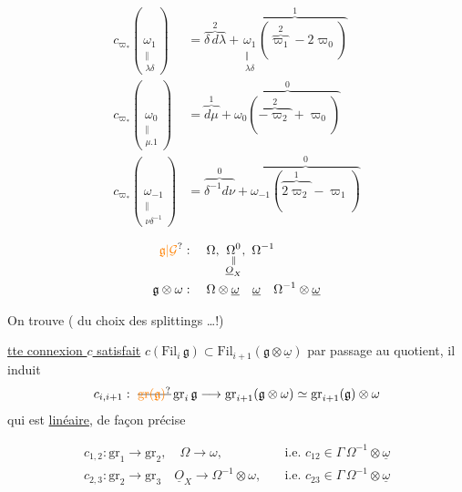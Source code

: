 \[ \begin{aligned}
 c_{\varpi_*}(\underset{\substack{\Vert\\\lambda\delta}}{\omega_1})&=\overbrace{\delta\,d\lambda}^{2}+\overbrace{\underset{\substack{\Vert\\\lambda\delta}}{\omega_1}(\overbrace{\varpi_1}^{2}-2\varpi_0)}^{1}\\
 c_{\varpi_*}(\underset{\substack{\Vert\\\mu.1}}{\omega_0})&=\overbrace{d\mu}^{1}+\overbrace{\omega_0(\overbrace{-\varpi_2}^{2}+\varpi_0)}^{0}\\
 c_{\varpi_*}(\underset{\substack{\Vert\\\nu\delta^{-1}}}{\omega_{-1}})&=\overbrace{\delta^{-1}d\nu}^{0}+\overbrace{\omega_{-1}(\overbrace{2\varpi_2}^{1}-\varpi_1)}^{0}
 \end{aligned} \]

\[ \begin{aligned}
 \unsure{\mathfrak g|\mathcal G}&:\quad \Omega,\ \underset{\substack{\Vert\\\underline O_X}}{\Omega^0},\ \Omega^{-1}\\
 \mathfrak g\otimes\omega&:\quad\Omega\otimes\underline\omega\quad\underline\omega\quad\Omega^{-1}\otimes\underline\omega
 \end{aligned} \]

On trouve  ( du choix des splittings \ldots !)

\uline{tte connexion $c$ satisfait} $c(\mathrm{Fil}_i\,\mathfrak g)\subset\mathrm{Fil}_{i+1}(\mathfrak g\otimes\underline\omega)$ par passage au quotient, il induit
\[ c_{i,i+1}:\ \deleted{\unsure{\mathrm{gr}(\mathfrak g)}}\,\mathrm{gr}_i\,\mathfrak g\longrightarrow\mathrm{gr}_{i+1}(\mathfrak g\otimes\omega)\simeq\mathrm{gr}_{i+1}(\mathfrak g)\otimes\omega \]
qui est \uline{linéaire}, de façon précise

\[ \begin{aligned}
 c_{1,2}:\mathrm{gr}_1\longrightarrow\mathrm{gr}_2,\quad \Omega\longrightarrow\omega,&\quad\text{i.e. }c_{12}\in\Gamma\,\Omega^{-1}\otimes\underline\omega\\
 c_{2,3}:\mathrm{gr}_2\longrightarrow\mathrm{gr}_3\quad \underline O_X\longrightarrow\Omega^{-1}\otimes\omega,&\quad\text{i.e. }c_{23}\in\Gamma\,\Omega^{-1}\otimes\underline\omega
 \end{aligned} \]

